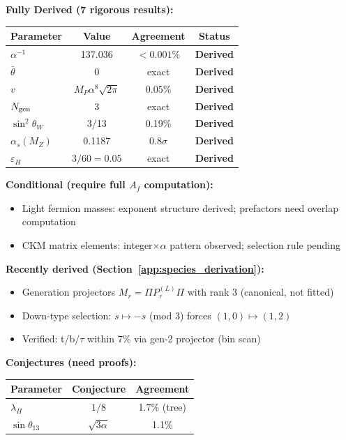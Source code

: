 \begin{tcolorbox}[colback=green!5!white, colframe=green!50!black,
  title=Summary: Standard Model Parameters from Topology, 
  boxsep=2pt, left=3pt, right=3pt]
\footnotesize

\textbf{Fully Derived (7 rigorous results):}
\begin{center}
\setlength{\tabcolsep}{3pt}
\renewcommand{\arraystretch}{1.0}
\begin{tabular}{lccc}
\toprule
Parameter & Value & Agreement & Status \\
\midrule
$\alpha^{-1}$ & 137.036 & $< 0.001\%$ & \textbf{Derived} \\
$\bar{\theta}$ & 0 & exact & \textbf{Derived} \\
$v$ & $M_P\alpha^8\sqrt{2\pi}$ & 0.05\% & \textbf{Derived} \\
$N_{\rm gen}$ & 3 & exact & \textbf{Derived} \\
$\sin^2\theta_W$ & 3/13 & 0.19\% & \textbf{Derived} \\
$\alpha_s(M_Z)$ & 0.1187 & $0.8\sigma$ & \textbf{Derived} \\
$\varepsilon_H$ & $3/60 = 0.05$ & exact & \textbf{Derived} \\
\bottomrule
\end{tabular}
\end{center}

\textbf{Conditional (require full $A_f$ computation):}
\begin{itemize}[nosep,leftmargin=*]
\item Light fermion masses: exponent structure derived; prefactors need overlap computation
\item CKM matrix elements: integer$\times\alpha$ pattern observed; selection rule pending
\end{itemize}

\textbf{Recently derived (Section~\ref{app:species_derivation}):}
\begin{itemize}[nosep,leftmargin=*]
\item Generation projectors $M_r = \Pi P_r^{(L)} \Pi$ with rank 3 (canonical, not fitted)
\item Down-type selection: $s \mapsto -s$ (mod 3) forces $(1,0) \mapsto (1,2)$
\item Verified: t/b/$\tau$ within 7\% via gen-2 projector (bin scan)
\end{itemize}

\textbf{Conjectures (need proofs):}
\begin{center}
\setlength{\tabcolsep}{4pt}
\renewcommand{\arraystretch}{1.0}
\begin{tabular}{lcc}
\toprule
Parameter & Conjecture & Agreement \\
\midrule
$\lambda_H$ & $1/8$ & 1.7\% (tree) \\
$\sin\theta_{13}$ & $\sqrt{3\alpha}$ & 1.1\% \\
\bottomrule
\end{tabular}
\end{center}


\end{tcolorbox}
